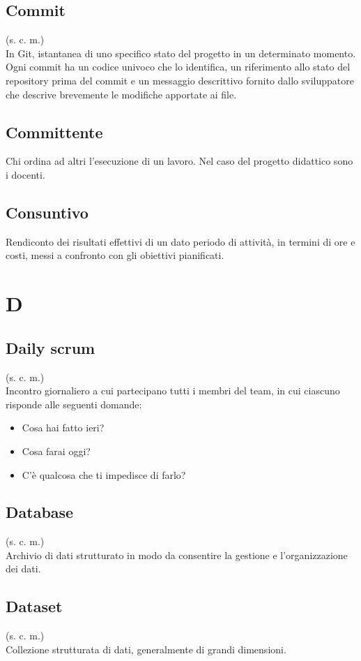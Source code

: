 \subsection{Commit}
(s. c. m.)\\
In Git, istantanea di uno specifico stato del progetto in un determinato momento.
Ogni commit ha un codice univoco che lo identifica,
un riferimento allo stato del repository prima del commit e un messaggio descrittivo
fornito dallo sviluppatore che descrive brevemente le modifiche apportate ai file.
\subsection{Committente}
Chi ordina ad altri l'esecuzione di un lavoro. Nel caso del progetto didattico
sono i docenti.
\subsection{Consuntivo}
Rendiconto dei risultati effettivi di un dato periodo di attività, in termini
di ore e costi, messi a confronto con gli obiettivi pianificati. \pagebreak
\section{D}
\subsection{Daily scrum}
(s. c. m.)\\
Incontro giornaliero a cui partecipano tutti i membri del team, in cui ciascuno
risponde alle seguenti domande:
\begin{itemize}
    \item Cosa hai fatto ieri?
    \item Cosa farai oggi?
    \item C'è qualcosa che ti impedisce di farlo?
\end{itemize}
\subsection{Database}
(s. c. m.)\\
Archivio di dati strutturato in modo da consentire la gestione e
l'organizzazione dei dati.
\subsection{Dataset}
(s. c. m.)\\
Collezione strutturata di dati, generalmente di grandi dimensioni.
